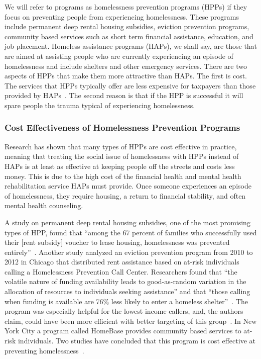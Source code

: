 \documentclass[10pt,letterpaper]{article}
\begin{document}
We will refer to programs as homelessness prevention programs (HPPs) if they focus on preventing people from experiencing homelessness. These programs include permanent deep rental housing subsidies, eviction prevention programs, community based services such as short term financial assistance, education, and job placement. Homeless assistance programs (HAPs), we shall say, are those that are aimed at assisting people who are currently experiencing an episode of homelessness and include shelters and other emergency services. There are two aspects of HPPs that make them more attractive than HAPs. The first is cost. The services that HPPs typically offer are less expensive for taxpayers than those provided by HAPs~\cite{shinn2019homelessness}. The second reason is that if the HPP is successful it will spare people the trauma typical of experiencing homelessness.

\subsubsection*{Cost Effectiveness of Homelessness Prevention Programs}
Research has shown that many types of HPPs are cost effective in practice, meaning that treating the social issue of homelessness with HPPs instead of HAPs is at least as effective at keeping people off the streets and costs less money. This is due to the high cost of the financial health and mental health rehabilitation service HAPs must provide. Once someone experiences an episode of homelessness, they require housing, a return to financial stability, and often mental health counseling.

A study on permanent deep rental housing subsidies, one of the most promising types of HPP, found that ``among the 67 percent of families who successfully used their [rent subsidy] voucher to lease housing, homelessness was prevented entirely''~\cite{shinn2019homelessness}. Another study analyzed an eviction prevention program from 2010 to 2012 in Chicago that distributed rent assistance based on at-risk individuals calling a Homelessness Prevention Call Center. Researchers found that ``the volatile nature of funding availability leads to good-as-random variation in the allocation of resources to individuals seeking assistance'' and that ``those calling when funding is available are 76\% less likely to enter a homeless shelter''~\cite{evans2016impact}. The program was especially helpful for the lowest income callers, and, the authors claim, could have been more efficient with better targeting of this group~\cite{evans2016impact}. In New York City a program called HomeBase provides community based services to at-risk individuals. Two studies have concluded that this program is cost effective at preventing homelessness~\cite{rolston2013evaluation, goodman2016homelessness}. 
\end{document}
